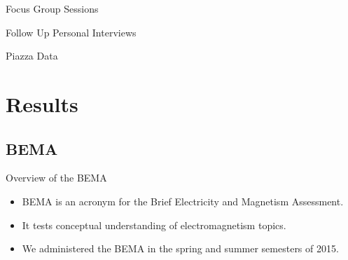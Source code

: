 \documentclass{beamer}
\begin{document}
\begin{frame}{Focus Group Sessions}
\end{frame}

\begin{frame}{Follow Up Personal Interviews}
\end{frame}

\begin{frame}{Piazza Data}
\end{frame}

\section{Results}

\subsection*{BEMA}

\begin{frame}{Overview of the BEMA}
\begin{itemize}
\item BEMA is an acronym for the Brief Electricity and Magnetism Assessment.
\item It tests conceptual understanding of electromagnetism topics.
\item We administered the BEMA in the spring and summer semesters of 2015.
\end{itemize}
\end{frame}
\end{document}
